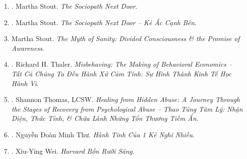 \documentclass{article}
\begin{document}
\begin{enumerate}
\begin{itemize}
		\item ``{\sc Solomon}'s highly readable, tag-all-bases new book $\ldots$ gives us nothing less than an evolving portrait of who, collectively, we are $\ldots$ ambitious \& broadly synthesizing $\ldots$ [written with] considerable stylistic grace $\ldots$ {\sc Solomon} is knowledgeable, trenchant, \& an admirable distiller of facts \& perspectives.'' -- {\sc Sven Birkerts}, {\it The New York Observer}
	\end{itemize}
	{\sf About the Author.} {\sc Andrew Solomon} is a professor of psychology at Columbia University, president of PEN American Center, \& a regular contributor to The New Yorker, NPR, \& The New York Times Magazine. A lecturer \& activist, he is the author of Far \& Away: Essays from the Brink of Change: Seven Continents, Twenty-Five Years; the National Book Critics Circle Award-winner Far from the Tree: Parents, Children, \& the Search for Identity, which has won thirty additional national awards; \& The Noonday Demon; An Atlas of Depression, which won the 2001 National Book Award, was a finalist for the Pulitzer Prize, \& has been published in twenty-four languages. He has also written a novel, A Stone Boat, which was a finalist for the Los Angeles Times First Fiction Award \& The Irony Tower: Soviet Artists in a Time of Glasnost. His TED talks have been viewed over ten million times. He lives in New York \& London \& is a dual national. For more information, visit the author's website at \url{AndrewSolomon.com}.
	
	{\sf YouTube.}
	\begin{itemize}
		\item \href{https://www.youtube.com/watch?v=-eBUcBfkVCo}{YouTube{\tt/}{\sc Andrew Solomon}: Trầm cảm, những bí mật được sẻ chia}.\hfill{\sf[done]}
	\end{itemize}
	\item \cite{Stout_sociopath}. {\sc Martha Stout}. {\it The Sociopath Next Door}.\hfill{\sf[reading]}
	\item \cite{Stout_sociopath_VN}. {\sc Martha Stout}. {\it The Sociopath Next Door -- Kẻ Ác Cạnh Bên}.\hfill{\sf[done]}	
	\item Martha Stout. {\it The Myth of Sanity: Divided Consciousness \& the Promise of Awareness}.	
	\item \cite{Thaler_misbehaving}. Richard H. Thaler. {\it Misbehaving: The Making of Behavioral Economics -- Tất Cả Chúng Ta Đều Hành Xử Cảm Tính: Sự Hình Thành Kinh Tế Học Hành Vi}.\hfill{\sf[reading]}
	\item \cite{Thomas2021}. Shannon Thomas, LCSW. {\it Healing from Hidden Abuse: A Journey Through the Stages of Recovery from Psychological Abuse -- Thao Túng Tâm Lý: Nhận Diện, Thức Tỉnh, \& Chữa Lành Những Tổn Thương Tiềm Ẩn}.\hfill{\sf[done]}
	\item \cite{Thu2022}. Nguyễn Đoàn Minh Thư. {\it Hành Tinh Của 1  Kẻ Nghĩ Nhiều}.\hfill{\sf[done]}
	\item \cite{Wei2022}. Xiu-Ying Wei. {\it Harvard Bốn Rưỡi Sáng}.\hfill{\sf[done]}
\end{enumerate}
\end{document}
